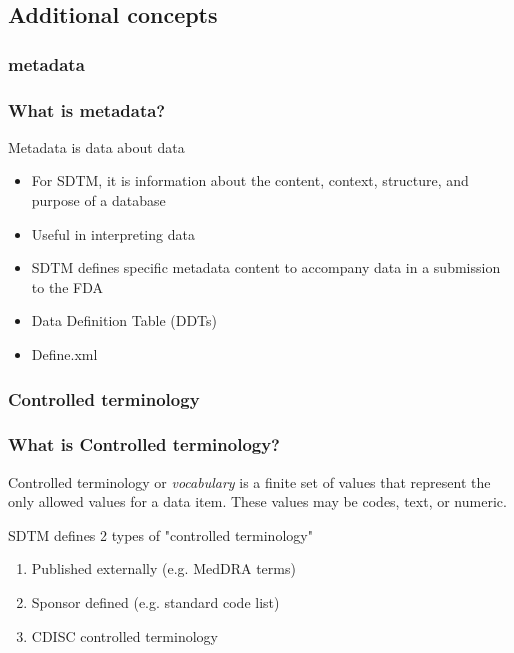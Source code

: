 \documentclass{beamer}
\begin{document}
\subsection[Additional concepts]{Additional concepts}

\subsubsection[metadata]{metadata}

\begin{frame}
	\frametitle{What is metadata?}
	\begin{definition}
		\alert{Metadata} is data about data
	\end{definition}
	\begin{itemize}
		\item For SDTM, it is information about the content, context, structure, and purpose of a database 
		\item Useful in interpreting data 
		\item SDTM defines specific metadata content to accompany data in a submission to the FDA
		\item Data Definition Table (DDTs)
		\item Define.xml
	\end{itemize}
\end{frame}


\subsubsection[Controlled terminology]{Controlled terminology}

\begin{frame}
	\frametitle{What is Controlled terminology?}
	\begin{definition}
		\alert{Controlled terminology} or \emph{vocabulary} is a finite set of values that represent
		 the only allowed values for a data item. 
		 These values may be codes, text, or numeric.
	\end{definition}
	SDTM defines 2 types of "controlled terminology"
	\begin{enumerate}
		\item Published externally (e.g. MedDRA terms)
		\item Sponsor defined (e.g. standard code list)
      \item CDISC controlled terminology
	\end{enumerate}
\end{frame}
\end{document}
